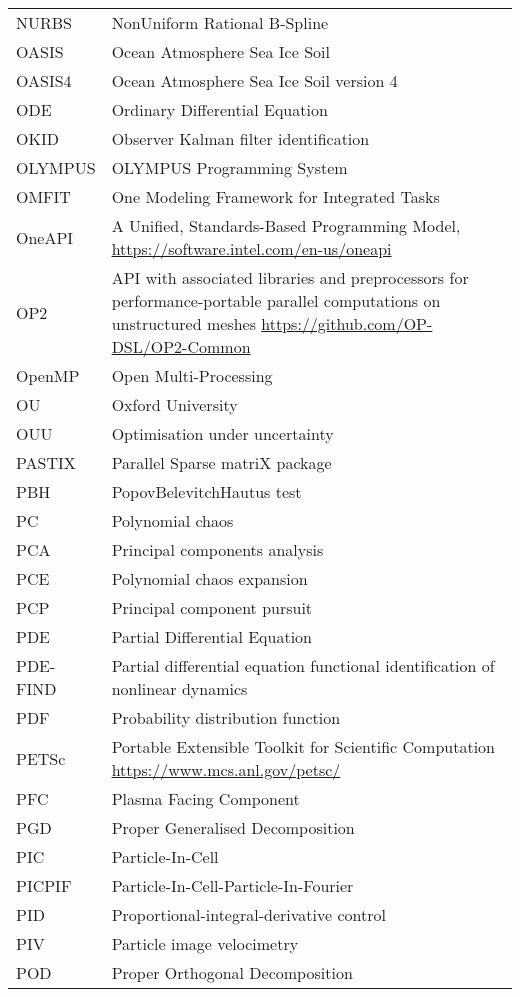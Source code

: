 \begin{longtable}{|p{4.0cm}|p{12.0cm}|}
NURBS & NonUniform Rational B-Spline \\
OASIS &  Ocean Atmosphere Sea Ice Soil\\
OASIS4 &  Ocean Atmosphere Sea Ice Soil version 4\\
ODE & Ordinary Differential Equation \\
OKID  & Observer Kalman filter identification \\
OLYMPUS & OLYMPUS Programming System\\
OMFIT & One Modeling Framework for Integrated Tasks\\
OneAPI & A Unified, Standards-Based Programming Model, \url{https://software.intel.com/en-us/oneapi}\\
OP2 & API with associated libraries and preprocessors for performance-portable parallel computations on unstructured meshes \url{https://github.com/OP-DSL/OP2-Common}\\
OpenMP & Open Multi-Processing \\
OU & Oxford University \\
OUU & Optimisation under uncertainty \\
PASTIX & Parallel Sparse matriX package\\
PBH  & PopovBelevitchHautus test \\
PC & Polynomial chaos \\
PCA  & Principal components analysis \\
PCE & Polynomial chaos expansion \\
PCP  & Principal component pursuit \\
PDE & Partial Differential Equation \\
PDE-FIND  & Partial differential equation functional identification of nonlinear dynamics \\
PDF  & Probability distribution function \\
PETSc & Portable Extensible Toolkit for Scientific Computation \url{https://www.mcs.anl.gov/petsc/}\\
PFC & Plasma Facing Component\\
PGD & Proper Generalised Decomposition \\
PIC & Particle-In-Cell\\
PICPIF & Particle-In-Cell-Particle-In-Fourier\\
PID  & Proportional-integral-derivative control \\
PIV  & Particle image velocimetry \\
POD & Proper Orthogonal Decomposition \\

\end{longtable}
